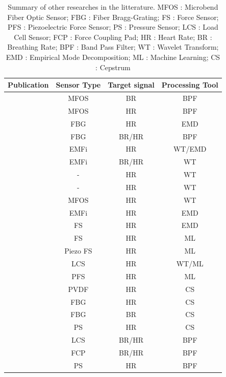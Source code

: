 \documentclass[twoside,twocolumn]{article}
\begin{document}
		{
		\begin{table}[ht]
		\centering
		 \begin{tabular}{||c c c c||} 
		 \hline
		 Publication & Sensor Type & Target signal & Processing Tool \\ [0.5ex] 
		 \hline\hline
		 \cite{lau_intensity-modulated_2013} &	MFOS & BR & BPF \\
		 \hline
		 \cite{chen_portable_2012}	& MFOS & HR & BPF \\
		 \hline
		 \cite{sadek_automatic_2015} & FBG & HR & EMD \\
		 \hline
		 \cite{dziuda_monitoring_2012} & FBG & BR/HR & BPF \\
		 \hline
		 \cite{pino_noninvasive_2015} & EMFi & HR & WT/EMD \\
		 \hline 
		 \cite{postolache_vital_2007} & EMFi & BR/HR & WT \\
		 \hline
		 \cite{jin_novel_2009} & - & HR & WT \\
		 \hline
		 \cite{deliere_ballistocardiogram_2015} & - & HR & WT \\
		 \hline
		 \cite{sadek_continuous_2017} & MFOS & HR & WT \\
		 \hline
		 \cite{pinheiro_online_2010} & EMFi & HR & EMD \\
		 \hline
		 \cite{song_extracting_2015} & FS & HR & EMD \\
		 \hline
		 \cite{bruser_adaptive_2011} & FS & HR & ML \\
		 \hline
		 \cite{paalasmaa_detecting_2008} & Piezo FS & HR & ML \\
		 \hline
		 \cite{noh_development_2010} & LCS & HR & WT/ML \\
		 \hline
		 \cite{katz_contact-free_2016} & PFS & HR & ML \\
		 \hline
		 \cite{bruser_improvement_2015} & PVDF & HR & CS \\
		 \hline
		 \cite{zhu_heart_2014} & FBG & HR & CS \\
		 \hline
		 \cite{zhu_estimating_2015}	 & FBG & BR & CS \\
		 \hline
		 \cite{kortelainen_multichannel_2012} & PS & HR & CS \\
		 \hline
		 \cite{lee_ballistocardiogram_2015} & LCS & BR/HR & BPF \\
		 \hline
		 \cite{mack_development_2009} & FCP & BR/HR & BPF \\
		 \hline
		 \cite{lydon_robust_2015} & PS & HR & BPF \\
		 \hline
		\end{tabular}
		\label{table*:methods_compared}
		\caption{Summary of other researches in the litterature. MFOS : Microbend Fiber Optic Sensor; FBG : Fiber Bragg-Grating; FS : Force Sensor; PFS : Piezoelectric Force Sensor; PS :  Pressure Sensor; LCS : Load Cell Sensor; FCP : Force Coupling Pad; HR : Heart Rate; BR : Breathing Rate; BPF : Band Pass Filter; WT : Wavelet Transform; EMD : Empirical Mode Decomposition; ML : Machine Learning; CS : Cepstrum}
		\end{table}
		}
		
\end{document}
